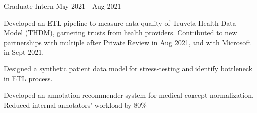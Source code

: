 \begin{cventries}
	\vspace{-2mm}

	\cventry
	{Graduate Intern}
	{}
	{}
	{May 2021 - Aug 2021}
	{\begin{cvitems}
			\item {Developed an ETL pipeline to measure data quality of Truveta Health Data Model (THDM), garnering trusts from health providers. Contributed to new partnerships with multiple after Private Review in Aug 2021, and with Microsoft in Sept 2021.}
			\item {Designed a synthetic patient data model for stress-testing and identify bottleneck in ETL process.}
			\item {Developed an annotation recommender system for medical concept normalization. Reduced internal annotators' workload by 80\%}
		\end{cvitems}}




\end{cventries}
